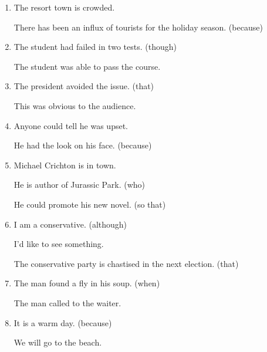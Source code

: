 \begin{enumerate}
\item The resort town is crowded.

  There has been an influx of tourists for the holiday season. (because)

\item The student had failed in two tests. (though)

  The student was able to pass the course.

\item The president avoided the issue. (that)

  This was obvious to the audience.

\item Anyone could tell he was upset.

  He had the look on his face. (because)

\item Michael Crichton is in town.

 He is author of Jurassic Park. (who)

 He could promote his new novel. (so that)

\item I am a conservative. (although)

 I'd like to see something.

 The conservative party is chastised in the next election. (that)

\item The man found a fly in his soup. (when)

  The man called to the waiter.

\item It is a warm day. (because)

 We will go to the beach.

\end{enumerate}

